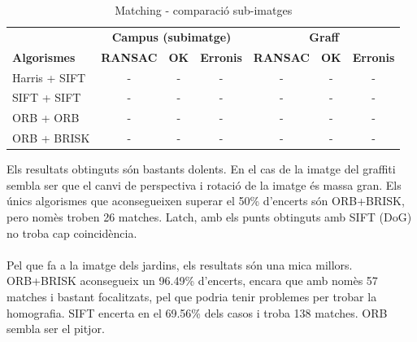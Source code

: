 		\begin{table}[H]
			\begin{center}
				\begin{tabular}{l | c c c | c c c}
					& \multicolumn{3}{c|}{\textbf{Campus (subimatge)}} & \multicolumn{3}{c}{\textbf{Graff}} \\
					\textbf{Algorismes} & \textbf{RANSAC} & \textbf{OK} & \textbf{Erronis} & \textbf{RANSAC} & \textbf{OK} & \textbf{Erronis} \\ \hline
					Harris + SIFT & - & - & - & - & - & - \\
					SIFT + SIFT & - & - & - & - & - & - \\
					ORB + ORB & - & - & - & - & - & - \\
					ORB + BRISK & - & - & - & - & - & - \\
				\end{tabular}
			\end{center}
			\caption{Matching - comparació sub-imatges}
		\end{table}
		\noindent
		Els resultats obtinguts són bastants dolents. En el cas de la imatge del graffiti sembla ser que el canvi de perspectiva i rotació de la imatge és massa gran.
		Els únics algorismes que aconsegueixen superar el 50\% d'encerts són ORB+BRISK, pero nomès troben 26 matches. Latch, amb els punts obtinguts amb SIFT (DoG) no troba cap coincidència.\\\\
		Pel que fa a la imatge dels jardins, els resultats són una mica millors. ORB+BRISK aconsegueix un 96.49\% d'encerts, encara que amb nomès 57 matches i bastant focalitzats, pel que podria tenir
		problemes per trobar la homografia. SIFT encerta en el 69.56\% dels casos i troba 138 matches. ORB sembla ser el pitjor.\\

